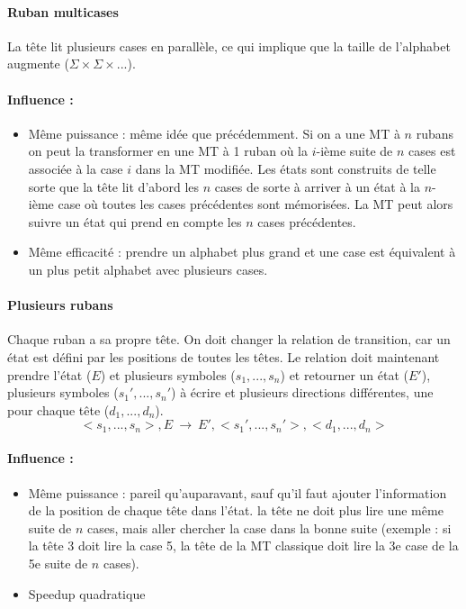\paragraph{Ruban multicases} La tête lit plusieurs cases en parallèle, ce qui
implique que la taille de l'alphabet augmente ($\Sigma \times \Sigma \times ...$).

\paragraph{Influence :}
\begin{itemize}
	\item Même puissance : même idée que précédemment. Si on a une MT à $n$ rubans on peut la transformer en une MT à 1 ruban où la $i$-ième suite de $n$ cases est associée à la case $i$ dans la MT modifiée. Les états sont construits de telle sorte que la tête lit d'abord les $n$ cases de sorte à arriver à un état à la $n$-ième case où toutes les cases précédentes sont mémorisées. La MT peut alors suivre un état qui prend en compte les $n$ cases précédentes.
	\item Même efficacité : prendre un alphabet plus grand et une case est équivalent à un plus petit alphabet avec plusieurs cases.
\end{itemize}

\paragraph{Plusieurs rubans} Chaque ruban a sa propre tête.
On doit changer la relation de transition, car un état est défini par les positions
de toutes les têtes. Le relation doit maintenant prendre l'état ($E$) et plusieurs
symboles ($s_1,...,s_n$) et retourner un état ($E'$), plusieurs symboles
($s_1',...,s_n'$) à écrire et plusieurs directions différentes, une pour chaque tête
($d_1,...,d_n$).
$$ <s_1,...,s_n>, E \ \rightarrow \ E', <s_1',...,s_n'>, <d_1,...,d_n> $$
\paragraph{Influence :}
\begin{itemize}
	\item Même puissance : pareil qu'auparavant, sauf qu'il faut ajouter l'information de la position de chaque tête dans l'état. la tête ne doit plus lire une même suite de $n$ cases, mais aller chercher la case dans la bonne suite (exemple : si la tête 3 doit lire la case 5, la tête de la MT classique doit lire la 3e case de la 5e suite de $n$ cases).
	\item Speedup quadratique
\end{itemize}

